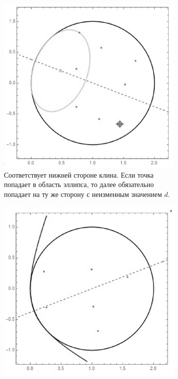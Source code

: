 \documentclass[a4paper]{article}
\begin{document}
\begin{figure}[h!]
  \centering
  \begin{subfigure}[b]{0.4\linewidth}
    \includegraphics[width=\linewidth]{phaseA}
    \caption{Соответствует нижней стороне клина. Если точка попадает в область эллипса, то далее обязательно попадает на ту же сторону с неизменным значением $d$.}
    \label{fig:phaseA}
  \end{subfigure}
  \quad\quad\quad\quad
  \begin{subfigure}[b]{0.4\linewidth}
    \includegraphics[width=\linewidth]{phaseB}

\end{subfigure}
\end{figure}
\end{document}
